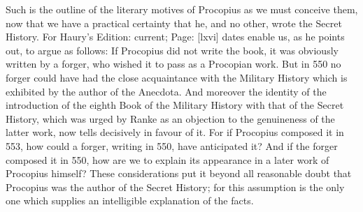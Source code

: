 Such is the outline of the literary motives of Procopius as we must conceive them, now that we have a practical certainty that he, and no other, wrote the Secret History. For Haury\texthebrew{}’s Edition: current; Page: [lxvi] dates enable us, as he points out, to argue as follows: If Procopius did not write the book, it was obviously written by a forger, who wished it to pass as a Procopian work. But in 550 no forger could have had the close acquaintance with the Military History which is exhibited by the author of the Anecdota. And moreover the identity of the introduction of the eighth Book of the Military History with that of the Secret History, which was urged by Ranke as an objection to the genuineness of the latter work, now tells decisively in favour of it. For if Procopius composed it in 553, how could a forger, writing in 550, have anticipated it? And if the forger composed it in 550, how are we to explain its appearance in a later work of Procopius himself? These considerations put it beyond all reasonable doubt that Procopius was the author of the Secret History; for this assumption is the only one which supplies an intelligible explanation of the facts.

